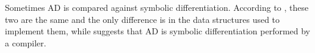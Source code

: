 Sometimes AD is compared against symbolic differentiation.
According to \cite{Laue2020}, these two are the same and the only difference is in the data structures used to implement them, while \cite{Elliott_2018} suggests that AD is symbolic differentiation performed by a compiler.

